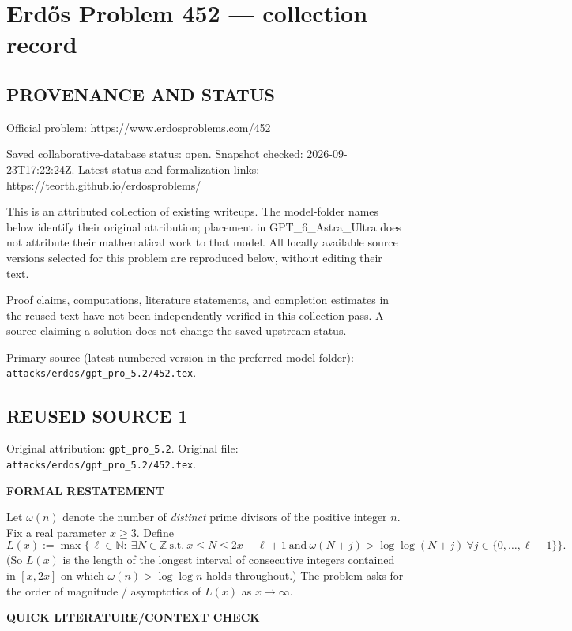 \section*{Erd\H{o}s Problem 452 --- collection record}

\subsection*{PROVENANCE AND STATUS}
Official problem: https://www.erdosproblems.com/452

Saved collaborative-database status: open.
Snapshot checked: 2026-09-23T17:22:24Z.
Latest status and formalization links: https://teorth.github.io/erdosproblems/

This is an attributed collection of existing writeups. The model-folder names below identify their original attribution; placement in GPT\_6\_Astra\_Ultra does not attribute their mathematical work to that model. All locally available source versions selected for this problem are reproduced below, without editing their text.

Proof claims, computations, literature statements, and completion estimates in the reused text have not been independently verified in this collection pass. A source claiming a solution does not change the saved upstream status.

Primary source (latest numbered version in the preferred model folder): \texttt{attacks/erdos/gpt\_pro\_5.2/452.tex}.

\subsection*{REUSED SOURCE 1}
Original attribution: \texttt{gpt\_pro\_5.2}.
Original file: \texttt{attacks/erdos/gpt\_pro\_5.2/452.tex}.


\textbf{FORMAL RESTATEMENT}

Let $\omega(n)$ denote the number of \emph{distinct} prime divisors of the positive integer $n$.
Fix a real parameter $x\ge 3$. Define
\[
L(x):=\max\Big\{\,\ell\in\mathbb N:\ \exists N\in\mathbb Z\ \text{s.t.}\ x\le N\le 2x-\ell+1\ \text{and}\ \omega(N+j)>\log\log(N+j)\ \forall j\in\{0,\dots,\ell-1\}\Big\}.
\]
(So $L(x)$ is the length of the longest interval of consecutive integers contained in $[x,2x]$ on which $\omega(n)>\log\log n$ holds throughout.) The problem asks for the order of magnitude / asymptotics of $L(x)$ as $x\to\infty$.

\textbf{QUICK LITERATURE/CONTEXT CHECK}

